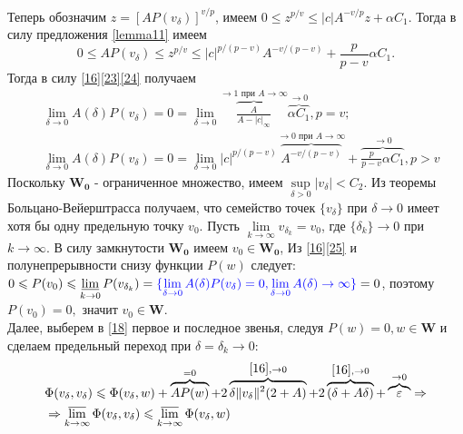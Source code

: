 Теперь обозначим $z=[AP(v_{\delta})]^{v/p}$, имеем $0\leqslant z^{p/v}\leqslant |c|A^{-v/p}z+\alpha C_1$. Тогда в силу предложения \ref{lemma11} имеем
\begin{equation}
\label{24}
0\leqslant AP(v_{\delta})\leqslant z^{p/v}\leqslant |c|^{p/(p-v)}A^{-v/(p-v)}+\frac{p}{p-v}\alpha C_1.
\end{equation}
Тогда в силу \eqref{16}\eqref{23}\eqref{24} получаем
\begin{equation}
\label{25}
\begin{aligned}
&\lim_{\delta\rightarrow 0}A(\delta)P(v_{\delta})=0=\lim_{\delta\rightarrow 0}\overbrace{\frac{A}{A-|c|_{\infty}}}^{\rightarrow 1\text{ при }A\rightarrow\infty}\overbrace{\alpha C_1}^{\rightarrow 0},p=v;\\
&\lim_{\delta\rightarrow 0}A(\delta)P(v_{\delta})=0=\lim_{\delta\rightarrow 0}|c|^{p/(p-v)}\overbrace{A^{-v/(p-v)}}^{\rightarrow 0\text{ при }A\rightarrow\infty}+\overbrace{\frac{p}{p-v}\alpha C_1}^{\rightarrow 0},p>v
\end{aligned}
\end{equation}
Поскольку $\mathbf{W_0}$ - ограниченное множество, имеем $\sup\limits_{\delta>0}|v_{\delta}|<C_2$. Из теоремы Больцано-Вейерштрасса получаем, что семейство точек $\{v_{\delta} \}$ при $\delta\rightarrow 0$ имеет хотя бы одну предельную точку $v_0$. Пусть $\lim\limits_{k\rightarrow\infty}v_{\delta_k}=v_0$, где $\{\delta_k \}\rightarrow 0$ при $k\rightarrow \infty$. В силу замкнутости $\mathbf{W_0}$ имеем $v_0\in\mathbf{W_0}$, Из \eqref{16}\eqref{25} и полунепрерывности снизу функции $P(w)$ следует: $0\leqslant P(v_0)\leqslant \varliminf\limits_{k\rightarrow 0}P(v_{\delta_k})=\textcolor{blue}{\{\lim\limits_{\delta\rightarrow 0} A(\delta)P(v_{\delta})=0,\lim\limits_{\delta\rightarrow 0}A(\delta)\rightarrow\infty\}}=0$, поэтому $ P(v_0)=0,$ значит $v_0\in\mathbf{W}.$\\
Далее, выберем в \eqref{18} первое и последное звенья, следуя $P(w)=0,w\in\mathbf{W}$ и сделаем предельный переход при $\delta=\delta_k\rightarrow 0$:
\begin{equation}
\label{varlim}
\begin{aligned}
&\Phi(v_{\delta},v_{\delta})\leqslant \Phi(v_{\delta},w)+\overbrace{AP(w)}^{=0}+2\overbrace{\delta\|v_{\delta}\|^2(2+A)}^{\eqref{16},\rightarrow 0}+2\overbrace{(\delta+A\delta)}^{\eqref{16},\rightarrow 0}+\overbrace{\varepsilon}^{\rightarrow 0}\Rightarrow\\
&\Rightarrow\varlimsup\limits_{k\rightarrow\infty}\Phi(v_{\delta},v_{\delta})\leqslant \varlimsup\limits_{k\rightarrow\infty}\Phi(v_{\delta},w)
\end{aligned}
\end{equation} 
